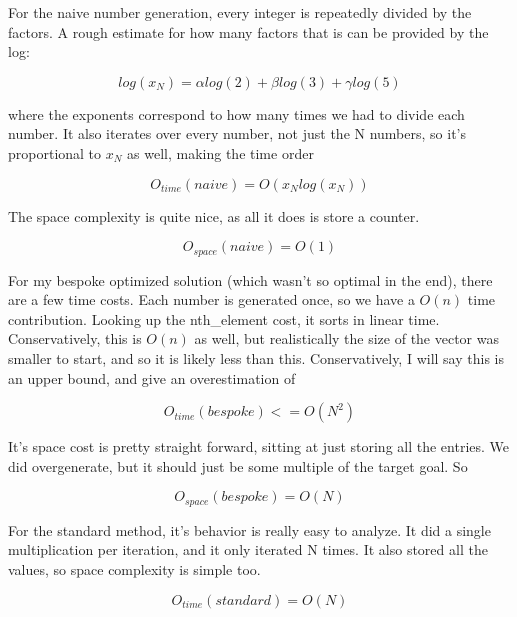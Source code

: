 \documentclass{article}
\begin{document}
For the naive number generation, every integer is repeatedly divided by the factors. A rough estimate for how many factors that is can be provided by the log:

\begin{equation}
    log(x_{N}) = \alpha log(2) + \beta log(3) + \gamma log(5)
\end{equation}

where the exponents correspond to how many times we had to divide each number. It also iterates over every number, not just the N numbers, so it's proportional to $x_{N}$ as well, making the time order

\begin{equation}
    O_{time}(naive) = O(x_{N} log( x_{N} ))
\end{equation}

The space complexity is quite nice, as all it does is store a counter.

\begin{equation}
    O_{space}(naive) = O(1)
\end{equation}

For my bespoke optimized solution (which wasn't so optimal in the end), there are a few time costs. Each number is generated once, so we have a $O(n)$ time contribution. Looking up the nth\_element cost, it sorts in linear time. Conservatively, this is $O(n)$ as well, but realistically the size of the vector was smaller to start, and so it is likely less than this. Conservatively, I will say this is an upper bound, and give an overestimation of

\begin{equation}
    O_{time}(bespoke) <= O(N^{2})
\end{equation}

It's space cost is pretty straight forward, sitting at just storing all the entries. We did overgenerate, but it should just be some multiple of the target goal. So

\begin{equation}
    O_{space}(bespoke) = O(N)
\end{equation}

For the standard method, it's behavior is really easy to analyze. It did a single multiplication per iteration, and it only iterated N times. It also stored all the values, so space complexity is simple too. 

\begin{equation}
    O_{time}(standard) = O(N)
\end{equation}
\end{document}
